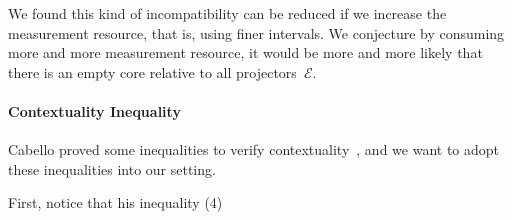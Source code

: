 \documentclass[english,reprint, aps, prl,superscriptaddress, showpacs,
showkeys, longbibliography, amsmath, amssymb]{revtex4-1}
\theoremstyle{plain}
\theoremstyle{definition}
\newcommand{\events}{\ensuremath{\mathcal{E}}}
\begin{document}
We found this kind of incompatibility can be reduced if we increase
the measurement resource, that is, using finer intervals. We conjecture
by consuming more and more measurement resource, it would be more
and more likely that there is an empty core relative to all projectors~$\events$.

\newpage{}

\paragraph{Contextuality Inequality}

Cabello proved some inequalities to verify contextuality~\cite{Cabello_2008},
and we want to adopt these inequalities into our setting.

First, notice that his inequality (4)


\end{document}

